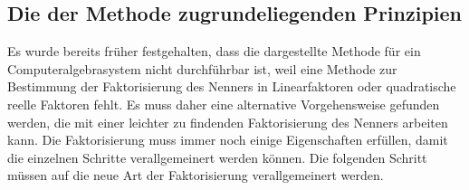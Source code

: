 %
%
%
\subsection{Die der Methode zugrundeliegenden Prinzipien
\label{buch:ratint:bernoulli:subsection:prinzip}}
Es wurde bereits früher festgehalten, dass die dargestellte Methode
für ein Computeralgebrasystem nicht durchführbar ist, weil eine
Methode zur Bestimmung der Faktorisierung des Nenners in Linearfaktoren
oder quadratische reelle Faktoren fehlt.
%
Es muss daher eine alternative Vorgehensweise gefunden werden,
die mit einer leichter zu findenden Faktorisierung des Nenners
arbeiten kann.
Die Faktorisierung muss immer noch einige Eigenschaften erfüllen,
damit die einzelnen Schritte verallgemeinert werden können.
Die folgenden Schritt müssen auf die neue Art der Faktorisierung
verallgemeinert werden.


